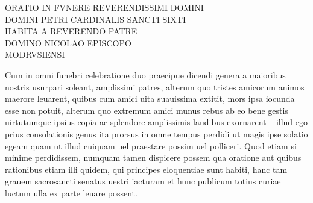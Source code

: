 \documentclass[a5paper,twoside]{article}
\begin{document}
\frenchspacing

\fontsize{11}{13.2}
\selectfont

\linespread{1.1}

\thispagestyle{empty}


\beginnumbering
\autopar


\pstart

{\centering

\noindent ORATIO IN FVNERE REVERENDISSIMI DOMINI \\
DOMINI PETRI CARDINALIS SANCTI SIXTI \\
HABITA A REVERENDO PATRE \\
DOMINO NICOLAO 
EPISCOPO \\
MODRVSIENSI

}

\pend


\bigskip

\numberpstarttrue

\setcounter{pstart}{1}


Cum in omni funebri celebratione duo praecipue dicendi genera a maioribus nostris usurpari soleant, amplissimi patres, alterum quo tristes amicorum animos maerore leuarent, quibus cum amici uita suauissima extitit, mors ipsa iocunda esse non potuit, alterum quo extremum amici munus rebus ab eo bene gestis uirtutumque ipsius copia ac splendore amplissimis laudibus exornarent – illud ego prius consolationis genus ita prorsus in omne tempus perdidi ut magis ipse solatio egeam quam ut illud cuiquam uel praestare possim uel polliceri. Quod etiam si minime perdidissem, numquam tamen dispicere possem qua oratione aut quibus rationibus etiam illi quidem, qui principes eloquentiae sunt habiti, hanc tam grauem sacrosancti senatus uestri iacturam et hunc publicum totius curiae luctum ulla ex parte leuare possent. 
\end{document}
